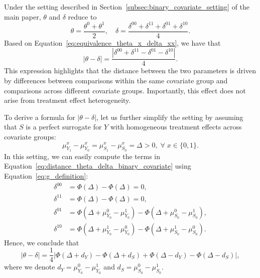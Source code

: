 \documentclass[referee,usenatbib]{biom}
\begin{document}
Under the setting described in Section~\ref{subsec:binary_covariate_setting} of the main paper, \(\theta\) and \(\delta\) reduce to
\begin{equation*}
    \theta = \frac{\theta^{0} + \theta^{1}}{2}, \quad \delta = \frac{\delta^{00} + \delta^{11} + \delta^{01} + \delta^{10}}{4}.
\end{equation*}
Based on Equation~\eqref{eq:equivalence_theta_x_delta_xx}, we have that
\begin{equation}
\label{eq:distance_theta_delta_binary_covariate}
    | \theta - \delta | = \frac{ \left| \delta^{00} + \delta^{11} - \delta^{01} - \delta^{10} \right| }{4}.
\end{equation}
This expression highlights that the distance between the two parameters is driven by differences between comparisons within the same covariate group and comparisons across different covariate groups. Importantly, this effect does not arise from treatment effect heterogeneity.

To derive a formula for \(|\theta - \delta|\), let us further simplify the setting by assuming that \(S\) is a perfect surrogate for \(Y\) with homogeneous treatment effects across covariate groups:
\begin{equation*}
    \mu^{x}_{Y_{1}} - \mu^{x}_{Y_{0}} =
    \mu^{x}_{S_{1}} - \mu^{x}_{S_{0}} = \Delta > 0, \; \forall \; x \in \{0,1\}.
\end{equation*}
In this setting, we can easily compute the terms in Equation~\eqref{eq:distance_theta_delta_binary_covariate} using Equation~\eqref{eq:g_definition}:
\begin{align*}
        \delta^{00} & = \Phi(\Delta) - \Phi(\Delta) = 0, \\
        \delta^{11} & = \Phi(\Delta) - \Phi(\Delta) = 0, \\
        \delta^{01} & = \Phi\!\left(\Delta + \mu^{0}_{Y_{0}} - \mu^{1}_{Y_{0}}\right) - \Phi\!\left(\Delta + \mu^{0}_{S_{0}} - \mu^{1}_{S_{0}}\right), \\
        \delta^{10} & = \Phi\!\left(\Delta + \mu^{1}_{Y_{0}} - \mu^{0}_{Y_{0}}\right) - \Phi\!\left(\Delta + \mu^{1}_{S_{0}} - \mu^{0}_{S_{0}}\right).
\end{align*}
Hence, we conclude that 
\begin{equation*}
    |\theta - \delta| = \frac{1}{4} \left| \Phi(\Delta + d_{Y}) - \Phi(\Delta + d_{S}) + \Phi(\Delta - d_{Y}) - \Phi(\Delta - d_{S}) \right|,
\end{equation*}
where we denote \(d_{Y} = \mu^{0}_{Y_{0}} - \mu^{1}_{Y_{0}}\) and \(d_{S} = \mu^{0}_{S_{0}} - \mu^{1}_{S_{0}}\).
\end{document}

